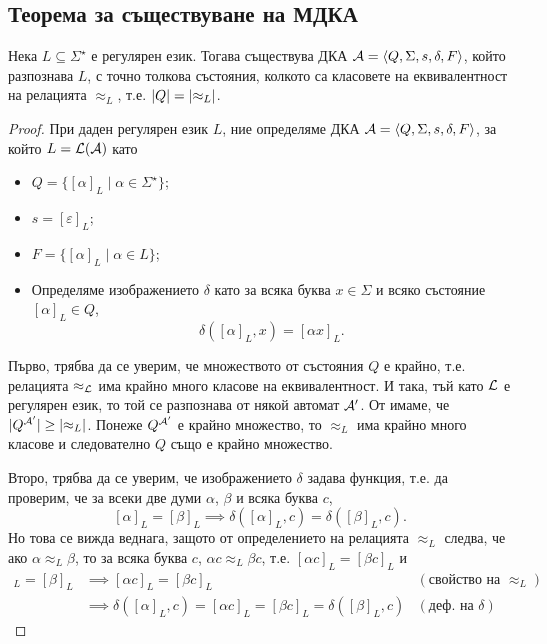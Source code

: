 \subsection{Теорема за съществуване на МДКА}
\begin{thm}
  \label{th:myhill-nerode}
  Нека $L\subseteq \Sigma^\star$ е регулярен език.
  Тогава съществува ДКА $\mathcal{A} = \langle{Q,\Sigma,s,\delta,F}\rangle$, който разпознава $L$,
  с точно толкова състояния, колкото са класовете на еквивалентност на релацията $\approx_L$,
  т.е. $\lvert{Q}\rvert = \lvert{\approx_L}\rvert$.
\end{thm}
\begin{proof}
  При даден регулярен език $L$, ние определяме ДКА $\mathcal{A} = \langle{Q,\Sigma,s,\delta,F}\rangle$, за който $L = \mathcal{L}(\mathcal{A})$ като
  \begin{itemize}
  \item
    $Q = \{[\alpha]_L\mid \alpha\in \Sigma^\star\}$;
  \item
    $s = [\varepsilon]_L$;
  \item
    $F = \{[\alpha]_L\mid \alpha\in L\}$;
  \item
    Определяме изображението $\delta$ като 
    за всяка буква $x \in \Sigma$ и всяко състояние $[\alpha]_L\in Q$, 
    \[\delta([\alpha]_L,x) = [\alpha x]_L.\]
  \end{itemize}
  
  Първо, трябва да се уверим, че множеството от състояния $Q$ е крайно, т.е.
  релацията $\approx_{\mathcal{L}}$ има крайно много класове на еквивалентност.
  И така, тъй като $\mathcal{L}$ е регулярен език, то той се разпознава от някой автомат $\mathcal{A}'$.
  От  имаме, че $\lvert{Q^{\mathcal{A}'}}\rvert \geq \lvert{\approx_L}\rvert$.
  Понеже $Q^{\mathcal{A}'}$ е крайно множество, то $\approx_L$ има крайно много класове и 
  следователно $Q$ също е крайно множество.

  Второ, трябва да се уверим, че изображението $\delta$ задава функция, т.е. 
  да проверим, че за всеки две думи $\alpha$, $\beta$ и всяка буква $c$,
  \[[\alpha]_L = [\beta]_L \implies \delta([\alpha]_L,c) = \delta([\beta]_L,c).\]
  Но това се вижда веднага, защото от определението на релацията $\approx_L$ следва, че
  ако $\alpha \approx_L \beta$, то за всяка буква $c$, $\alpha c \approx_L \beta c$,
  т.е. $[\alpha c]_L = [\beta c]_L$ и 
  \begin{align*}
    [\alpha]_L = [\beta]_L & \implies [\alpha c]_L = [\beta c]_L & (\text{свойство на }\approx_L)\\
    & \implies \delta([\alpha]_L,c) = [\alpha c]_L = [\beta c]_L = \delta([\beta]_L,c) & (\text{деф. на }\delta)
  \end{align*}
  

\end{proof}
